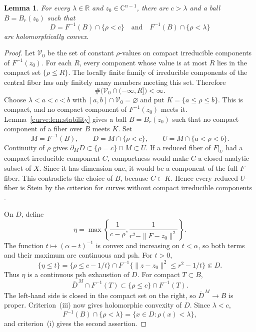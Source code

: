 \documentclass[11pt]{amsart}
\newtheorem{lemma}[theorem]{Lemma}
\theoremstyle{definition}
\theoremstyle{remark}
\numberwithin{equation}{section}
\newcommand{\C}{\mathbb C}
\newcommand{\R}{\mathbb R}
\begin{document}
\begin{lemma}\label{curve:lem:neighborhood}
For every $\lambda\in\R$ and $z_0\in\C^{n-1}$, there are $c>\lambda$
and a ball $B=B_r(z_0)$ such that
\[
 D=F^{-1}(B)\cap\{\rho<c\}
 \quad\text{and}\quad
 F^{-1}(B)\cap\{\rho<\lambda\}
\]
are holomorphically convex.
\end{lemma}
\begin{proof}
Let $\mathcal V_0$ be the set of constant $\rho$-values on compact irreducible
components of $F^{-1}(z_0)$. For each $R$, every component whose
value is at most $R$ lies in the compact set $\{\rho\le R\}$.
The locally finite family of irreducible components of the central
fiber has only finitely many members meeting this set. Therefore
\[
 \#\bigl(\mathcal V_0\cap(-\infty,R]\bigr)<\infty.
\]
Choose $\lambda<a<c<b$ with $[a,b]\cap\mathcal V_0=\varnothing$ and put
$K=\{a\le\rho\le b\}$. This is compact, and no compact component
of $F^{-1}(z_0)$ meets it. Lemma~\ref{curve:lem:stability} gives a
ball $B=B_r(z_0)$ such that no compact component of a fiber over
$B$ meets $K$. Set
\[
 M=F^{-1}(B),\qquad D=M\cap\{\rho<c\},\qquad
 U=M\cap\{a<\rho<b\}.
\]
Continuity of $\rho$ gives
$\partial_M D\subset\{\rho=c\}\cap M\subset U$.
If a reduced fiber of $F|_U$ had a compact irreducible component $C$,
compactness would make $C$ a closed analytic subset of $X$. Since
it has dimension one, it would be a component of the full $F$-fiber.
This contradicts the choice of $B$, because $C\subset K$.
Hence every reduced $U$-fiber is Stein by the criterion for curves
without compact irreducible components
\cite[\S3, p.~1663]{Vajaitu2022}.

On $D$, define
\[
 \eta=\max\left\{\frac1{c-\rho},
                  \frac1{r^2-\|F-z_0\|^2}\right\}.
\]
The function $t\mapsto(\alpha-t)^{-1}$ is convex and increasing on
$t<\alpha$, so both terms and their maximum are continuous and psh.
For $t>0$,
\[
 \{\eta\le t\}
 =\{\rho\le c-1/t\}\cap
 F^{-1}\{\|z-z_0\|^2\le r^2-1/t\}\Subset D.
\]
Thus $\eta$ is a continuous psh exhaustion of $D$. For compact $T\subset B$,
\[
 \overline D^{\,M}\cap F^{-1}(T)
 \subset\{\rho\le c\}\cap F^{-1}(T).
\]
The left-hand side is closed in the compact set on the right, so
$\overline D^{\,M}\to B$ is proper. Criterion~\textup{(iii)} now
gives holomorphic convexity of $D$. Since $\lambda<c$,
\[
 F^{-1}(B)\cap\{\rho<\lambda\}
 =\{x\in D:\rho(x)<\lambda\},
\]
and criterion~\textup{(i)} gives the second assertion.
\end{proof}
\end{document}
